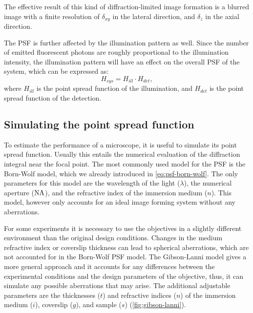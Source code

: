     The effective result of this kind of diffraction-limited image formation is a blurred image with a finite resolution of $\delta_{xy}$ in the lateral direction, and $\delta_z$ in the axial direction.

    The PSF is further affected by the illumination pattern as well. Since the number of emitted fluorescent photons are roughly proportional to the illumination intensity, the illumination pattern will have an effect on the overall PSF of the system, which can be expressed as:
    \begin{equation}
      H_{sys} = H_{ill} \cdot H_{det},
      \label{eq:systemPSF}
    \end{equation}
    where $H_{ill}$ is the point spread function of the illumination, and $H_{det}$ is the point spread function of the detection.


  \subsection{Simulating the point spread function}
  \label{sec:simu}
    To estimate the performance of a microscope, it is useful to simulate its point spread function. Usually this entails the numerical evaluation of the diffraction integral near the focal point. The most commonly used model for the PSF is the Born-Wolf model, which we already introduced in \autoref{eq:psf-born-wolf}. The only parameters for this model are the wavelength of the light ($\lambda$), the numerical aperture ($\operatorname{NA}$), and the refractive index of the immersion medium ($n$). This model, however only accounts for an ideal image forming system without any aberrations.
    
    For some experiments it is necessary to use the objectives in a slightly different environment than the original design conditions. Changes in the medium refractive index or coverslip thickness can lead to spherical aberrations, which are not accounted for in the Born-Wolf PSF model. The Gibson-Lanni model \cite{gibson_experimental_1992} gives a more general approach and it accounts for any differences between the experimental conditions and the design parameters of the objective, thus, it can simulate any possible aberrations that may arise. The additional adjustable parameters are the thicknesses ($t$) and refractive indices ($n$) of the immersion medium ($i$), coverslip ($g$), and sample ($s$) (\autoref{fig:gibson-lanni}).

